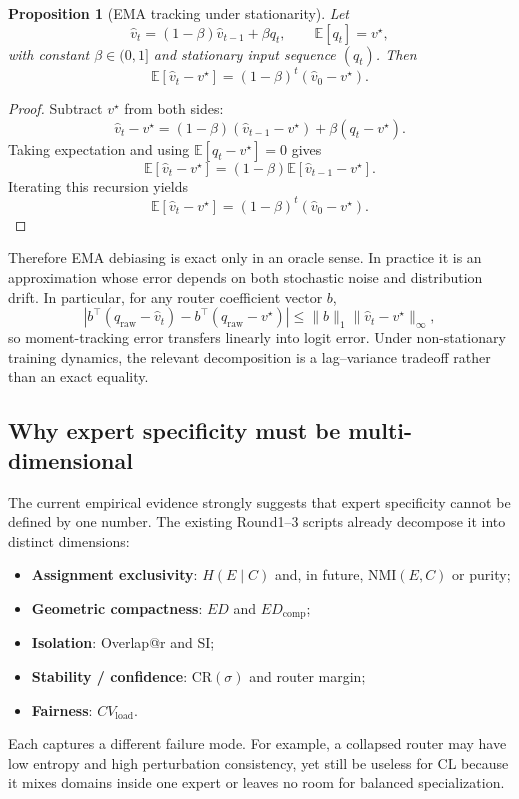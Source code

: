 \documentclass[11pt]{article}
\newtheorem{proposition}{Proposition}
\begin{document}
\begin{proposition}[EMA tracking under stationarity]
Let
\[
\hat v_t=(1-\beta)\hat v_{t-1}+\beta q_t,
\qquad
\mathbb E[q_t]=v^\star,
\]
with constant $\beta\in(0,1]$ and stationary input sequence $(q_t)$. Then
\[
\mathbb E[\hat v_t-v^\star]=(1-\beta)^t(\hat v_0-v^\star).
\]
\end{proposition}

\begin{proof}
Subtract $v^\star$ from both sides:
\[
\hat v_t-v^\star
=
(1-\beta)(\hat v_{t-1}-v^\star)+\beta(q_t-v^\star).
\]
Taking expectation and using $\mathbb E[q_t-v^\star]=0$ gives
\[
\mathbb E[\hat v_t-v^\star]
=
(1-\beta)\mathbb E[\hat v_{t-1}-v^\star].
\]
Iterating this recursion yields
\[
\mathbb E[\hat v_t-v^\star]=(1-\beta)^t(\hat v_0-v^\star).
\]
\end{proof}

Therefore EMA debiasing is exact only in an oracle sense. In practice it is an approximation whose error depends on both stochastic noise and distribution drift. In particular, for any router coefficient vector $b$,
\[
\left|b^\top(q_{\mathrm{raw}}-\hat v_t)-b^\top(q_{\mathrm{raw}}-v^\star)\right|
\le
\|b\|_1\|\hat v_t-v^\star\|_\infty,
\]
so moment-tracking error transfers linearly into logit error. Under non-stationary training dynamics, the relevant decomposition is a lag--variance tradeoff rather than an exact equality.

\subsection{Why expert specificity must be multi-dimensional}
The current empirical evidence strongly suggests that expert specificity cannot be defined by one number. The existing Round1--3 scripts already decompose it into distinct dimensions:
\begin{itemize}
    \item \textbf{Assignment exclusivity}: $H(E\mid C)$ and, in future, NMI$(E,C)$ or purity;
    \item \textbf{Geometric compactness}: $ED$ and $ED_{\mathrm{comp}}$;
    \item \textbf{Isolation}: Overlap@r and SI;
    \item \textbf{Stability / confidence}: CR$(\sigma)$ and router margin;
    \item \textbf{Fairness}: $CV_{\mathrm{load}}$.
\end{itemize}
Each captures a different failure mode. For example, a collapsed router may have low entropy and high perturbation consistency, yet still be useless for CL because it mixes domains inside one expert or leaves no room for balanced specialization.
\end{document}
